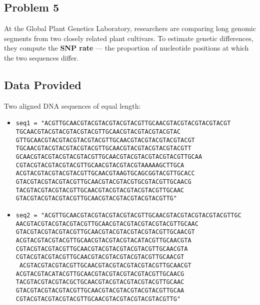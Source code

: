 \documentclass[12pt]{article}
\begin{document}
\newpage
\subsection{Problem 5}

At the Global Plant Genetics Laboratory, researchers are comparing long genomic segments from two closely related plant cultivars. To estimate genetic differences, they compute the \textbf{SNP rate} --- the proportion of nucleotide positions at which the two sequences differ.

\subsection*{Data Provided}
Two aligned DNA sequences of equal length:

\begin{itemize}
    \item \texttt{seq1 = "ACGTTGCAACGTACGTACGTACGTACGTTGCAACGTACGTACGTACGTACGT
    \\ TGCAACGTACGTACGTACGTACGTTGCAACGTACGTACGTACGTAC \\ GTTGCAACGTACGTACGTACGTACGTTGCAACGTACGTACGTACGTACGT
    \\ TGCAACGTACGTACGTACGTACGTTGCAACGTACGTACGTACGTACGTT \\ GCAACGTACGTACGTACGTACGTTGCAACGTACGTACGTACGTACGTTGCAA
    \\CGTACGTACGTACGTACGTTGCAACGTACGTACGTAAAAAGCTTGCA \\ ACGTACGTACGTACGTACGTTGCAACGTAAGTGCAGCGGTACGTTGCACC
    \\GTACGTACGTACGTACGTTGCAACGTACGTACGTGCGTACGTTGCAACG \\ TACGTACGTACGTACGTTGCAACGTACGTACGTACGTACGTTGCAAC
    \\GTACGTACGTACGTACGTTGCAACGTACGTACGTACGTACGTTG"}
    \item \texttt{seq2 = "ACGTTGCAACGTACGTACGTACGTACGTTGCAACGTACGTACGTACGTACGTTGC \\
    AACGTACGTACGTACGTACGTTGCAACGTACGTACGTACGTACGTTGCAAC\\
    GTACGTACGTACGTACGTTGCAACGTACGTACGTACGTACGTTGCAACGT\\
    ACGTACGTACGTACGTTGCAACGTACGTACGTACATACGTTGCAACGTA\\
    CGTACGTACGTACGTTGCAACGTACGTACGTACGTACGTTGCAACGTA\\
    CGTACGTACGTACGTTGCAACGTACGTACGTACGTACGTTGCAACGT\\\
    ACGTACGTACGTACGTTGCAACGTACGTACGTACGTACGTTGCAACGT\\
    ACGTACGTACATACGTTGCAACGTACGTACGTACGTACGTTGCAACG\\
    TACGTACGTACGTACGCTGCAACGTACGTACGTACGTACGTTGCAAC\\
    GTACGTACGTACGTACGTTGCAACGTACGTACGTACGTACGTTGCAA\\
    CGTACGTACGTACGTACGTTGCAACGTACGTACGTACGTACGTTG"}
\end{itemize}
\end{document}
